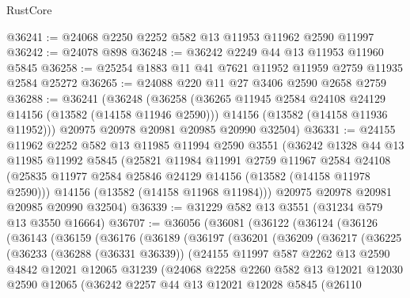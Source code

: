 \begin{lexlean}{RustCore}
\begin{coremodule}
@36241 := @24068 @2250 @2252 @582 @13 @11953 @11962 @2590 @11997
@36242 := @24078 @898
@36248 := @36242 @2249 @44 @13 @11953 @11960 @5845
@36258 := @25254 @1883 @11 @41 @7621 @11952 @11959 @2759 @11935 @2584 @25272
@36265 := @24088 @220 @11 @27 @3406 @2590 @2658 @2759
@36288 := @36241
    (@36248
      (@36258
        (@36265 @11945 @2584 @24108 @24129 @14156 (@13582 (@14158 @11946 @2590)))
        @14156
        (@13582 (@14158 @11936 @11952)))
      @20975
      @20978
      @20981
      @20985
      @20990
      @32504)
@36331 := @24155
    @11962
    @2252
    @582
    @13
    @11985
    @11994
    @2590
    @3551
    (@36242
      @1328
      @44
      @13
      @11985
      @11992
      @5845
      (@25821
        @11984
        @11991
        @2759
        @11967
        @2584
        @24108
        (@25835 @11977 @2584 @25846 @24129 @14156 (@13582 (@14158 @11978 @2590)))
        @14156
        (@13582 (@14158 @11968 @11984)))
      @20975
      @20978
      @20981
      @20985
      @20990
      @32504)
@36339 := @31229 @582 @13 @3551 (@31234 @579 @13 @3550 @16664)
@36707 := @36056
    (@36081
      (@36122
        (@36124
          (@36126
            (@36143
              (@36159
                (@36176
                  (@36189
                    (@36197
                      (@36201
                        (@36209
                          (@36217
                            (@36225
                              (@36233
                                (@36288 (@36331 @36339))
                                (@24155
                                  @11997
                                  @587
                                  @2262
                                  @13
                                  @2590
                                  @4842
                                  @12021
                                  @12065
                                  @31239
                                  (@24068
                                    @2258
                                    @2260
                                    @582
                                    @13
                                    @12021
                                    @12030
                                    @2590
                                    @12065
                                    (@36242
                                      @2257
                                      @44
                                      @13
                                      @12021
                                      @12028
                                      @5845
                                      (@26110

\end{coremodule}
\end{lexlean}
